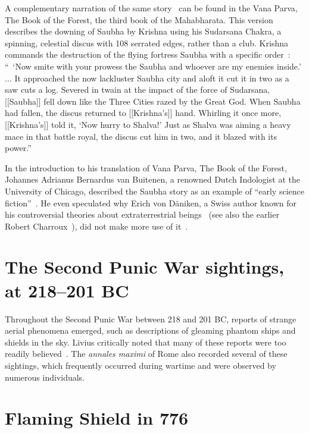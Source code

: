 A complementary narration of the same story~\cite[pp.~253-267]{vanBuitenen1975} can be found in the Vana Parva, The Book of the Forest, the third book of the Mahabharata. This version describes the downing of Saubha by Krishna using his Sudarsana Chakra, a spinning, celestial discus with 108 serrated edges, rather than a club.
Krishna commands the destruction of the flying fortress Saubha with a specific order~\cite[p.~266]{vanBuitenen1975}:
``~`Now smite with your prowess the Saubha and whoever are my enemies inside.' $\ldots$
It approached the now lackluster Saubha city and aloft it cut it in
two as a saw cuts a log. Severed in twain at the impact of the force of
Sudarsana,
[[Saubha]] fell down like the Three Cities razed by the Great God.
When Saubha had fallen, the discus returned to [[Krishna's]] hand. Whirling it
once more, [[Krishna's]] told it, `Now hurry to Shalva!' Just as Shalva was aiming
a heavy mace in that battle royal, the discus cut him in two, and it
blazed with its power.''


In the introduction to his translation of Vana Parva, The Book of the Forest, Johannes Adrianus Bernardus van Buitenen, a renowned Dutch Indologist at the University of Chicago,
described the Saubha story as an example of ``early science fiction''~\cite[p.~182]{vanBuitenen1975}.
He even speculated why Erich von D\"aniken, a Swiss author known for his controversial theories about extraterrestrial beings~\cite{vonDanikenKopp2015Apr}
(see also the earlier Robert Charroux~\cite{Charroux1971Mar}),
did not make more use of it~\cite[p.~202]{vanBuitenen1975}.


\section{The Second Punic War sightings, at 218--201 BC}
\label{2023-UFO-part-History-chapter-pre-1945-spw218-201BC}


Throughout the Second Punic War between 218 and 201 BC, reports of strange aerial phenomena emerged, such as descriptions of gleaming phantom ships and shields in the sky. Livius critically noted that many of these reports were too readily believed~\cite{Livius-21-62}. The {\it annales maximi} of Rome also recorded several of these sightings, which frequently occurred during wartime and were observed by numerous individuals.


\section{Flaming Shield in 776}
\label{2023-UFO-part-History-chapter-pre-1945-fs776}

